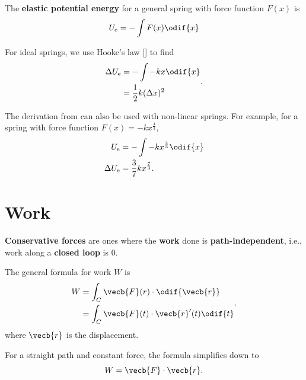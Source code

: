 The \textbf{elastic potential energy} for a general spring with force
function \(F(x)\) is
\begin{equation} \label{eq:general-elastic-potential-energy}
    U_\mathrm{e} = - \int F(x) \odif{x}
\end{equation}

For ideal springs, we use Hooke's law [] to find
\begin{equation}
    \begin{aligned}
        \Delta{U_\mathrm{e}} &= - \int - k x \odif{x} \\
        &= \frac{1}{2} k (\Delta{x})^2
    \end{aligned}.
\end{equation}

The derivation from  can
also be used with non-linear springs.
For example, for a spring with force function \(F(x) = -k x^\frac{4}{3}\),
\begin{equation}
    \begin{aligned}
        U_\mathrm{e} &= - \int -k x^\frac{4}{3} \odif{x} \\
        \Delta{U_\mathrm{e}} &= \frac{3}{7} k x^\frac{7}{3}.
    \end{aligned}
\end{equation}

\section{Work}

\textbf{Conservative forces} are ones where the \textbf{work} done is
\textbf{path-independent},
i.e., work along a \textbf{closed loop} is 0.

The general formula for work \(W\) is
\begin{equation} \label{eq:work}
    \begin{aligned}
        W &= \int_C \vecb{F}(r) \cdot \odif{\vecb{r}} \\
        &= \int_C \vecb{F}(t) \cdot \vecb{r}'(t) \odif{t} \\
    \end{aligned},
\end{equation}
where \(\vecb{r}\) is the displacement.

For a straight path and constant force,
the formula simplifies down to
\begin{equation*}
    W = \vecb{F} \cdot \vecb{r}.
\end{equation*}

